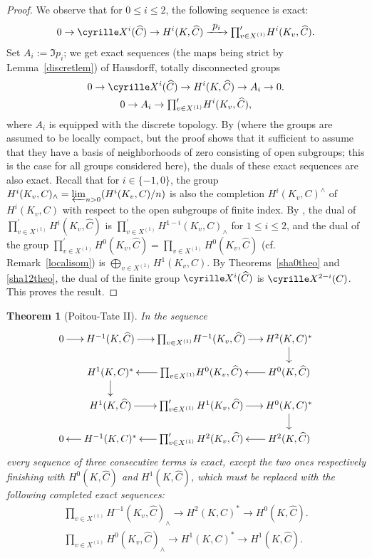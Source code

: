 \documentclass[11pt]{article}
\newcommand{\cf}{cf.\xspace}
\newcommand\To[1]{\mathchoice{\xrightarrow{\textstyle\kern4pt#1\kern3pt}}{\stackrel{#1}{\longrightarrow}}{}{}}
\newcommand{\tprod}{{\textstyle\prod}}
\theoremstyle{plain}
\newtheorem{theo}{Theorem}[section]
\theoremstyle{definition}
\newcommand\Sha{\cyrille X}
\begin{document}
\begin{proof}
We observe that for $0 \leq i \leq 2$, the following
sequence is exact:\vspace*{-3pt}
\[
0 \to \Sha^i(\widehat C) \to H^i(K,\widehat C) \To{p_i}
\tprod^{\prime}_{v \in X^{(1)}} H^i(K_v,\widehat C).
\]
Set $A_i:=\Im p_i$; we get exact sequences
(the maps being strict by Lemma~\ref{discretlem}) of
Hausdorff, totally disconnected groups
\begin{gather*}
0 \to \Sha^i(\widehat C) \to H^i(K,\widehat C) \to A_i \to 0.
\\
0 \to A_i \to \tprod^{\prime}_{v \in X^{(1)}} H^i(K_v,\widehat C),
\end{gather*}
where $A_i$ is equipped with the discrete topology. By \cite[Lem.\,2.4]{hss} (where the groups are assumed to be locally compact, but the proof shows
that it sufficient to assume
that they have a basis of neighborhoods of zero consisting
of open subgroups; this is the case for all groups considered here),
the duals of these exact sequences are also exact.
Recall that for $i \in \{-1, 0\}$, the group
$H^i(K_v,C)_{\wedge}=\varprojlim_{n >0} (H^i(K_v,C)/n)$ is also the
completion $H^i(K_v,C)^{\wedge}$ of $H^i(K_v,C)$ with respect to the
open subgroups of finite index.
By \cite[Th.\,3.1 \& 3.3]{demphd}, the dual of
$\prod^{\prime}_{v \in X^{(1)}} H^i(K_v,\widehat C)$ is
$\prod^{\prime}_{v \in X^{(1)}} H^{1-i}(K_v,C)_{\wedge}$
for $1 \leq i \leq 2$, and
the dual of the group
$\prod^{\prime}_{v \in X^{(1)}} H^0(K_v,\widehat C)=\tprod_{v \in X^{(1)}}
H^0(K_v,\widehat C)$ (\cf Remark~\ref{localisom}) is $\bigoplus_{v \in X^{(1)}}
H^1(K_v,C)$. By Theorems~\ref{sha0theo} and \ref{sha12theo},
the dual of the finite group $\Sha^i(\widehat C)$ is
$\Sha^{2-i}(C)$. This proves the result.
\end{proof}

\begin{theo}[Poitou-Tate II] \label{spt2}
In the sequence
\begin{equation} \label{ptdiag2}
\begin{array}{c}
\xymatrix@=5mm{
0 \ar[r]& H^{-1}(K,\widehat C) \ar[r]& \tprod_{v \in X^{(1)}}
H^{-1}(K_v,\widehat C) \ar[r]& H^2(K,C)^*\ar[d]\\
&H^1(K,C)^* \ar[d]&\ar[l] \tprod_{v \in X^{(1)}} H^{0}(K_v,\widehat C)
&\ar[l] H^0(K,\widehat C)\\
&H^1(K,\widehat C) \ar[r]& \prod^{\prime}_{v \in X^{(1)}} H^1(K_v,\widehat C) \ar[r]&H^0(K,C)^*\ar[d]\\
0 &\ar[l] H^{-1}(K,C)^* &\ar[l] \prod^{\prime}_{v \in X^{(1)}} H^2(K_v,\widehat C)&\ar[l] H^2(K,\widehat C)
}
\end{array}
\end{equation}
every sequence of three consecutive terms is exact, except the two ones
respectively finishing with $H^0(K,\widehat C)$ and $H^1(K,\widehat C)$,
which must be
replaced with the following completed exact sequences:
\begin{gather*}
\tprod_{v \in X^{(1)}} H^{-1}(K_v,\widehat C)_{\wedge} \to H^2(K,C)^*
\to H^0(K,\widehat C).
\\
\tprod_{v \in X^{(1)}} H^{0}(K_v,\widehat C)_{\wedge}
\to H^1(K,C)^*
\to H^1(K,\widehat C).
\end{gather*}
\end{theo}
\end{document}
